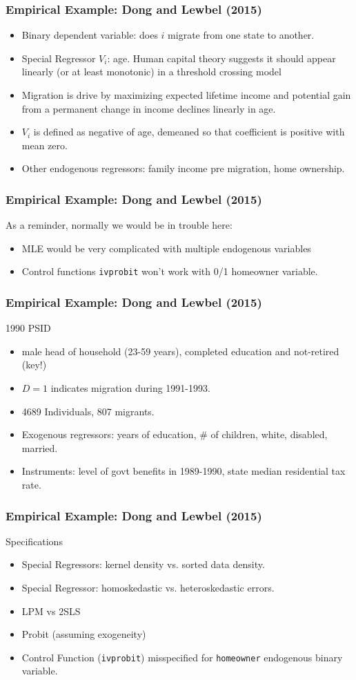 \begin{frame}
\frametitle{Empirical Example: Dong and Lewbel (2015)}
\begin{itemize}
\item Binary dependent variable: does $i$ migrate from one state to another. 
\item Special Regressor $V_i$: age. Human capital theory suggests it should appear linearly (or at least monotonic) in a threshold crossing model 
\item Migration is drive by maximizing expected lifetime income and potential gain from a permanent change in income declines linearly in age.
\item $V_i$ is defined as negative of age, demeaned so that coefficient is positive with mean zero.
\item Other endogenous regressors: family income pre migration, home ownership.
\end{itemize}
\end{frame}

\begin{frame}
\frametitle{Empirical Example: Dong and Lewbel (2015)}
As a reminder, normally we would be in trouble here:
\begin{itemize}
\item MLE would be very complicated with multiple endogenous variables
\item Control functions \texttt{ivprobit} won't work with 0/1 homeowner variable.
\end{itemize}
\end{frame}

\begin{frame}
\frametitle{Empirical Example: Dong and Lewbel (2015)}
1990 PSID
\begin{itemize}
\item male head of household (23-59 years), completed education and not-retired (key!)
\item $D=1$ indicates migration during 1991-1993.
\item 4689 Individuals, 807 migrants.
\item Exogenous regressors: years of education, \# of children, white, disabled, married.
\item Instruments: level of govt benefits in 1989-1990, state median residential tax rate.
\end{itemize}
\end{frame}

\begin{frame}
\frametitle{Empirical Example: Dong and Lewbel (2015)}
Specifications
\begin{itemize}
\item Special Regressors: kernel density vs. sorted data density.
\item Special Regressor: homoskedastic vs. heteroskedastic errors.
\item LPM vs 2SLS
\item Probit (assuming exogeneity)
\item Control Function (\texttt{ivprobit}) misspecified for \texttt{homeowner} endogenous binary variable.
\end{itemize}
\end{frame}


